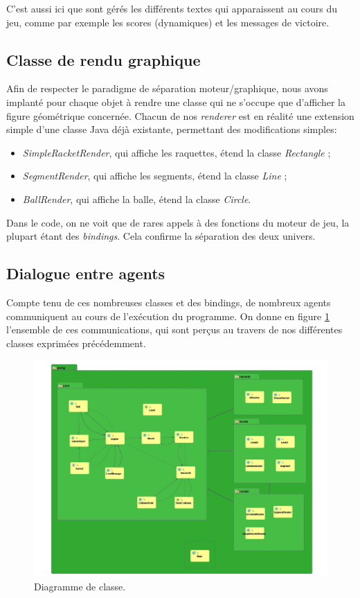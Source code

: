 \documentclass[a4paper,10pt]{article}
\theoremstyle{definition}
\begin{document}
        C'est aussi ici que sont gérés les différents textes qui apparaissent au cours du jeu, comme par exemple les scores (dynamiques) et les messages de victoire.
        
    \subsection{Classe de rendu graphique}
    Afin de respecter le paradigme de séparation moteur/graphique, nous avons implanté pour chaque objet à rendre une classe qui ne s'occupe que d'afficher la figure géométrique concernée. Chacun de nos \emph{renderer} est en réalité une extension simple d'une classe Java déjà existante, permettant des modifications simples:
    
    \begin{itemize}
      \item \emph{SimpleRacketRender}, qui affiche les raquettes, étend la classe \emph{Rectangle} ;
      \item \emph{SegmentRender}, qui affiche les segments, étend la classe \emph{Line} ;
      \item \emph{BallRender}, qui affiche la balle, étend la classe \emph{Circle}.
    \end{itemize}
    Dans le code, on ne voit que de rares appels à des fonctions du moteur de jeu, la plupart étant des \emph{bindings}. Cela confirme la séparation des deux univers.
    
    \subsection{Dialogue entre agents}
    
    Compte tenu de ces nombreuses classes et des bindings, de nombreux agents communiquent au cours de l'exécution du programme. On donne en figure \ref{fig:diag} l'ensemble de ces communications, qui sont perçus au travers de nos différentes classes exprimées précédemment.
    	\begin{figure}[!h]
  	  \begin{center}
    	    \includegraphics[width=\textwidth]{Class_diagram.jpg}
    	    \caption{Diagramme de classe.}
    	    \label{fig:diag}
  	  \end{center}
	\end{figure}	
\end{document}
